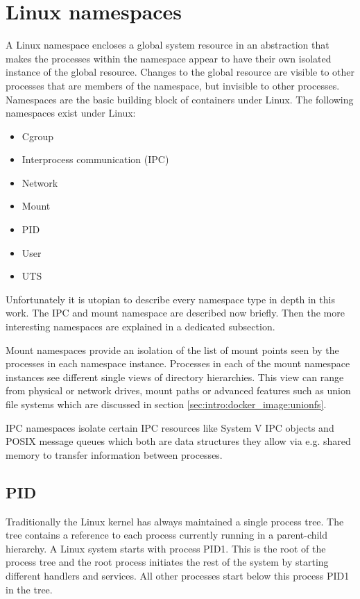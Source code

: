 \section{Linux namespaces}
\label{sec:intro:containerization:linux_namespaces}
A Linux namespace encloses a global system resource in an abstraction that makes the processes within the namespace appear to have their own isolated instance of the global resource. Changes to the global resource are visible to other processes that are members of the namespace, but invisible to other processes. Namespaces are the basic building block of containers under Linux. The following namespaces exist under Linux:
\begin{itemize}
\item Cgroup
\item Interprocess communication (IPC)
\item Network
\item Mount
\item PID
\item User
\item UTS
\end{itemize}
Unfortunately it is utopian to describe every namespace type in depth in this work. 
The IPC and mount namespace are described now briefly. Then the more interesting namespaces are explained in a dedicated subsection.

Mount namespaces provide an isolation of the list of mount points seen by the processes in each namespace instance. Processes in each of the mount namespace instances see different single views of directory hierarchies. This view can range from physical or network drives, mount paths or advanced features such as union file systems which are discussed in section \ref{sec:intro:docker_image:unionfs}.

IPC namespaces isolate certain IPC resources like System V IPC objects and POSIX message queues which both are data structures they allow via e.g. shared memory to transfer information between processes.

\subsection{PID}
\label{sec:intro:containerization:linux_namespaces:pid_namespaces}
Traditionally the Linux kernel has always maintained a single process tree. The tree contains a reference to each process currently running in a parent-child hierarchy. 
A Linux system starts with process PID1. This is the root of the process tree and the root process initiates the rest of the system by starting different handlers and services. All other processes start below this process PID1 in the tree. 

